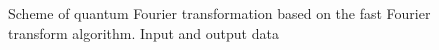 \begin{figure}
\centering



\caption{Scheme of quantum Fourier transformation based on the fast Fourier transform algorithm. Input and output data}
\label{figQuantCompQuantFourier0}
\end{figure}